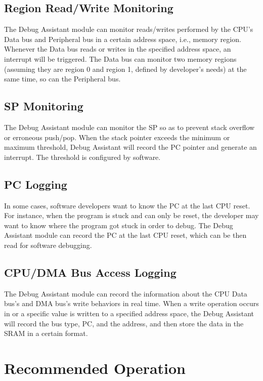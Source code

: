 \documentclass[main\_\_EN.tex]{subfiles}
\begin{document}
\subsection{Region Read/Write Monitoring}

The Debug Assistant module can monitor reads/writes performed by the CPU's Data bus and Peripheral bus in a certain address space, i.e., memory region. Whenever the Data bus reads or writes in the specified address space, an interrupt will be triggered. The Data bus can monitor two memory regions (assuming they are region 0 and region 1, defined by developer's needs) at the same time, so can the Peripheral bus.

\subsection{SP Monitoring}

The Debug Assistant module can monitor the SP so as to prevent stack overflow or erroneous push/pop. When the stack pointer exceeds the minimum or maximum threshold, Debug Assistant will record the PC pointer and generate an interrupt. The threshold is configured by software.

\subsection{PC Logging}

In some cases, software developers want to know the PC at the last CPU reset. For instance, when the program is stuck and can only be reset, the developer may want to know where the program got stuck in order to debug. The Debug Assistant module can record the PC at the last CPU reset, which can be then read for software debugging. 

\subsection{CPU/DMA Bus Access Logging}

The Debug Assistant module can record the information about the CPU Data bus's and DMA bus's write behaviors in real time. When a write operation occurs in or a specific value is written to a specified address space, the Debug Assistant will record the bus type, PC, and the address, and then store the data in the SRAM in a certain format.

\section{Recommended Operation}
\label{sec:dbgassist-recommended-operation}
\end{document}
